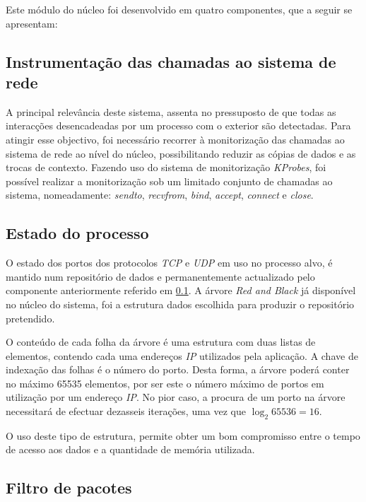 Este módulo do núcleo foi desenvolvido em quatro componentes, que a seguir se apresentam:


\subsection{Instrumentação das chamadas ao sistema de rede}
\label{sub:mon_syscalls}

A principal relevância deste sistema, assenta no pressuposto de que todas as interacções desencadeadas por um processo com o exterior são detectadas.
Para atingir esse objectivo, foi necessário recorrer à monitorização das chamadas ao sistema de rede ao nível do núcleo, possibilitando reduzir as cópias de dados e as trocas de contexto.
Fazendo uso do sistema de monitorização \textit{KProbes}, foi possível realizar a monitorização sob um limitado conjunto de chamadas ao sistema, nomeadamente: \textit{sendto}, \textit{recvfrom}, \textit{bind}, \textit{accept}, \textit{connect} e \textit{close}.

\subsection{Estado do processo}
\label{sub:data_repository}

O estado dos portos dos protocolos \textit{TCP} e \textit{UDP} em uso no processo alvo, é mantido num repositório de dados e permanentemente actualizado pelo componente anteriormente referido em \ref{sub:mon_syscalls}.
A árvore \textit{Red and Black} já disponível no núcleo do sistema, foi a estrutura dados escolhida para produzir o repositório pretendido.

O conteúdo de cada folha da árvore é uma estrutura com duas listas de elementos, contendo cada uma endereços \textit{IP} utilizados pela aplicação.
A chave de indexação das folhas é o número do porto.
Desta forma, a árvore poderá conter no máximo 65535 elementos, por ser este o número máximo de portos em utilização por um endereço \textit{IP}.
No pior caso, a procura de um porto na árvore necessitará de efectuar dezasseis iterações, uma vez que \begin{math}\log _2 65536 = 16 \end{math}.

O uso deste tipo de estrutura, permite obter um bom compromisso entre o tempo de acesso aos dados e a quantidade de memória utilizada.

\subsection{Filtro de pacotes}
\label{sub:packet_filter}


